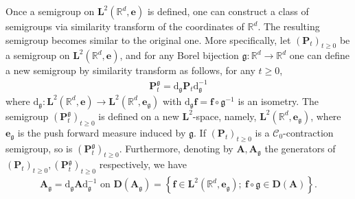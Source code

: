 \documentclass[12pt]{amsart}
\numberwithin{equation}{section}
\newcommand{\bb}{\mathbb}
\newcommand{\cc}{\mathcal}
\renewcommand{\geq}{\geqslant}
\newcommand{\bmrm}[2][2]{\mathbf{#2}^{#1}}
\newcommand{\D}{\mathbf{D}}
\newcommand{\f}{\mathbf{f}}
\theoremstyle{definition}
\theoremstyle{assump}
\theoremstyle{remark}
\begin{document}
{Once  a semigroup on $\bmrm{L}(\bb{R}^d,\mathbf{e})$ is defined,  one can construct a class of semigroups via similarity transform of the coordinates of $\bb{R}^d$. The resulting semigroup becomes similar to the original one. More specifically, let  $(\bm{P}_t)_{t\geq 0}$ be a semigroup on $\bmrm{L}(\bb{R}^d,\mathbf{e})$, and for any Borel bijection $\mathfrak{g}:\bb{R}^d\to\bb{R}^d$ one can define a new semigroup by similarity transform as follows, for any $t\geq0$,
\begin{align*}
\bm{P}^\mathfrak{g}_t =\mathrm{d}_{\mathfrak{g}}\bm{P}_t \mathrm{d}^{-1}_{\mathfrak{g}}
\end{align*}
where $\mathrm{d}_\mathfrak{g}:\bmrm{L}(\bb{R}^d,\mathbf{e})\to\bmrm{L}(\bb{R}^d,\mathbf{e}_\mathfrak{g})$ with $\mathrm{d}_\mathfrak{g} \f=\f\circ\mathfrak{g}^{-1}$ is an isometry.
The semigroup $(\bm{P}^\mathfrak{g}_t)_{t\geq 0}$ is defined on a new $\bmrm{L}$-space, namely, $\bmrm{L}(\bb{R}^d,\mathbf{e}_\mathfrak{g})$, where $\mathbf{e}_\mathfrak{g}$ is the push forward measure induced by $\mathfrak{g}$. If  $(\bm{P}_t)_{t\geq0}$  is a $\cc{C}_0$-contraction semigroup, so is $(\bm{P}^\mathfrak{g}_t)_{t\geq0}$. Furthermore, denoting by $\bm{A},\bm{A}_\mathfrak{g}$  the generators of $ (\bm{P}_t)_{t\geq0}, (\bm{P}^\mathfrak{g}_t)_{t\geq0}$ respectively, we have
\begin{align*}
\bm{A}_\mathfrak{g} =\mathrm{d}_{\mathfrak{g}}\bm{A} \mathrm{d}^{-1}_{\mathfrak{g}} \mbox{ on } \D(\bm{A}_\mathfrak{g})=\left\{\f\in\bmrm{L}(\bb{R}^d,\mathbf{e}_\mathfrak{g}); \: \f\circ\mathfrak{g}\in\D(\bm{A})\right\}.
\end{align*}
}
\end{document}

